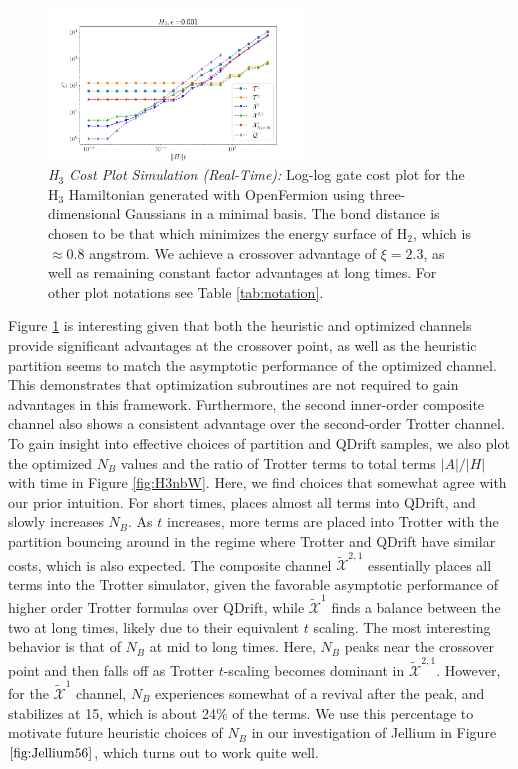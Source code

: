 \begin{figure}[htbp!]
    \centering
    \includegraphics[width=0.6\textwidth]{composite_numerics/H3update.png}
    \caption{\textit{H$_3$ Cost Plot Simulation (Real-Time): }Log-log gate cost plot for the {\rm H$_3$} Hamiltonian generated with OpenFermion using three-dimensional Gaussians in a minimal basis. The bond distance is chosen to be that which minimizes the energy surface of {\rm H$_2$}, which is $\approx 0.8$ angstrom. We achieve a crossover advantage of $\xi = 2.3$, as well as remaining constant factor advantages at long times. For other plot notations see Table \ref{tab:notation}.} \label{fig:H3}
\end{figure} 
\FloatBarrier

Figure \ref{fig:H3} is interesting given that both the heuristic and optimized channels provide significant advantages at the crossover point, as well as the heuristic partition seems to match the asymptotic performance of the optimized channel. This demonstrates that optimization subroutines are not required to gain advantages in this framework. Furthermore, the second inner-order composite channel also shows a consistent advantage over the second-order Trotter channel. \\

To gain insight into effective choices of partition and QDrift samples, we also plot the optimized $N_B$ values and the ratio of Trotter terms to total terms $|A|/|H|$ with time in Figure \ref{fig:H3nbW}. Here, we find choices that somewhat agree with our prior intuition. For short times, places almost all terms into QDrift, and slowly increases $N_B$. As $t$ increases, more terms are placed into Trotter with the partition bouncing around in the regime where Trotter and QDrift have similar costs, which is also expected. The composite channel $\widetilde{\mathcal{X}}^{2,1}$  essentially places all terms into the Trotter simulator, given the favorable asymptotic performance of higher order Trotter formulas over QDrift, while $\widetilde{\mathcal{X}}^{1}$ finds a balance between the two at long times, likely due to their equivalent $t$ scaling. The most interesting behavior is that of $N_B$ at mid to long times. Here, $N_B$ peaks near the crossover point and then falls off as Trotter $t$-scaling becomes dominant in $\widetilde{\mathcal{X}}^{2,1}$. However, for the $\widetilde{\mathcal{X}}^{1}$ channel, $N_B$ experiences somewhat of a revival after the peak, and stabilizes at 15, which is about 24\% of the terms. We use this percentage to motivate future heuristic choices of $N_B$ in our investigation of Jellium in Figure $\ref{fig:Jellium56}$, which turns out to work quite well. 

